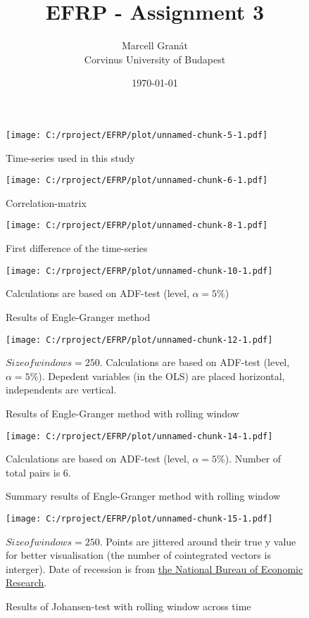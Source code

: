 \documentclass[12pt, a4paper, twoside, titlepage]{article}
\title{EFRP - Assignment 3}
\date{\today}
\author{Marcell Granát \\ Corvinus University of Budapest}
\begin{document}
  \maketitle

\begin{figure}[ht]
  \centering
  \texttt{[image: C:/rproject/EFRP/plot/unnamed-chunk-5-1.pdf]}
  \label{fig1}
  \caption{Time-series used in this study}
\end{figure}

\begin{figure}[ht]
  \centering
  \texttt{[image: C:/rproject/EFRP/plot/unnamed-chunk-6-1.pdf]}
  \label{fig2}
  \caption{Correlation-matrix}
\end{figure}

\begin{figure}[ht]
  \centering
  \texttt{[image: C:/rproject/EFRP/plot/unnamed-chunk-8-1.pdf]}
  \label{fig3}
  \caption{First difference of the time-series}
\end{figure}

\begin{figure}[ht]
  \centering
  \texttt{[image: C:/rproject/EFRP/plot/unnamed-chunk-10-1.pdf]}
  \label{fig4}
  \caption{Results of Engle-Granger method}
  Calculations are based on ADF-test (level, $\alpha = 5\%$)
\end{figure}

\begin{figure}[ht]
  \centering
  \texttt{[image: C:/rproject/EFRP/plot/unnamed-chunk-12-1.pdf]}
  \label{fig5}
  \caption{Results of Engle-Granger method with rolling window}
  $Size of windows = 250$. Calculations are based on ADF-test (level, $\alpha = 5\%$). Depedent variables (in the OLS) are placed horizontal, independents are vertical.
\end{figure}

\begin{figure}[ht]
  \centering
  \texttt{[image: C:/rproject/EFRP/plot/unnamed-chunk-14-1.pdf]}
  \label{fig6}
  \caption{Summary results of Engle-Granger method with rolling window}
  Calculations are based on ADF-test (level, $\alpha = 5\%$). Number of total pairs is 6.
\end{figure}

\begin{figure}[ht]
  \centering
  \texttt{[image: C:/rproject/EFRP/plot/unnamed-chunk-15-1.pdf]}
  \label{fig7}
  \caption{Results of Johansen-test with rolling window across time}
  $Size of windows = 250$. Points are jittered around their true y value for better visualisation (the number of cointegrated vectors is interger). Date of recession is from \href{https://www.nber.org/cycles.html}{the National Bureau of Economic Research}.
\end{figure}
\end{document}
